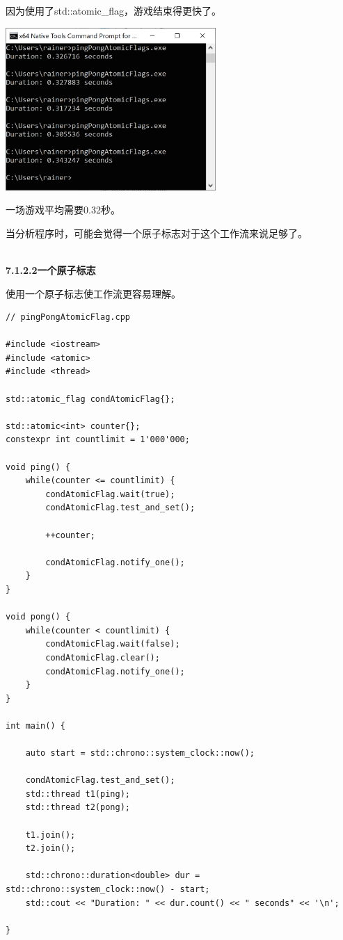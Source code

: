 因为使用了std::atomic\_flag，游戏结束得更快了。

\begin{center}
\includegraphics[width=0.6\textwidth]{content/3/chapter7/images/3.png}\\
\end{center}

一场游戏平均需要0.32秒。

当分析程序时，可能会觉得一个原子标志对于这个工作流来说足够了。

\hspace*{\fill} \\ %
\noindent
\textbf{7.1.2.2\hspace{0.2cm}一个原子标志}

使用一个原子标志使工作流更容易理解。

\begin{lstlisting}[style=styleCXX]
// pingPongAtomicFlag.cpp

#include <iostream>
#include <atomic>
#include <thread>

std::atomic_flag condAtomicFlag{};

std::atomic<int> counter{};
constexpr int countlimit = 1'000'000;

void ping() {
	while(counter <= countlimit) {
		condAtomicFlag.wait(true);
		condAtomicFlag.test_and_set();
		
		++counter;
		
		condAtomicFlag.notify_one();
	}
}

void pong() {
	while(counter < countlimit) {
		condAtomicFlag.wait(false);
		condAtomicFlag.clear();
		condAtomicFlag.notify_one();
	}
}

int main() {

	auto start = std::chrono::system_clock::now();
	
	condAtomicFlag.test_and_set();
	std::thread t1(ping);
	std::thread t2(pong);
	
	t1.join();
	t2.join();
	
	std::chrono::duration<double> dur = std::chrono::system_clock::now() - start;
	std::cout << "Duration: " << dur.count() << " seconds" << '\n';

}
\end{lstlisting}

